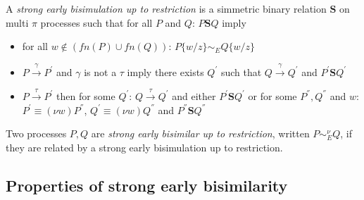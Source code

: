 \begin{definition}\label{strongEarlyBisimulationUpToRestriction}
  A \emph{strong early bisimulation up to restriction} is a simmetric binary relation $\mathbf{S}$ on multi $\pi$ processes such that for all $P$ and $Q$: $P \mathbf{S} Q$ imply
  \begin{itemize}
    \item
      for all $w\notin (fn(P)\cup fn(Q))$: $P\{w/z\} \sim_{E} Q\{w/z\}$
    \item
      $P \xrightarrow{\gamma} P^{'}$ and $\gamma$ is not a $\tau$ imply there exists $Q^{'}$ such that $Q \xrightarrow{\gamma} Q^{'}$ and $P^{'} \mathbf{S} Q^{'}$
    \item
      $P \xrightarrow{\tau} P^{'}$ then for some $Q^{'}$: $Q \xrightarrow{\tau} Q^{'}$ and either $P^{'} \mathbf{S} Q^{'}$ or for some $P^{''},Q^{''}$ and $w$: $P^{'}\equiv (\nu w)P^{''}$, $Q^{'}\equiv (\nu w)Q^{''}$ and $P^{''} \mathbf{S} Q^{''}$
  \end{itemize}
  Two processes $P,Q$ are \emph{strong early bisimilar up to restriction}, written $P \sim_{E}^{\nu} Q$, if they are related by a strong early bisimulation up to restriction.
\end{definition}


\subsection{Properties of strong early bisimilarity}


